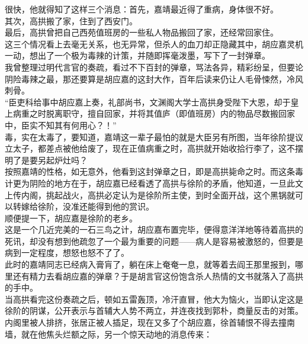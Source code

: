 \begin{multicols}{\theparacolNo}
很快，他就得知了这样三个消息：首先，嘉靖最近得了重病，身体很不好。\\

其次，高拱搬了家，住到了西安门。\\

最后，高拱曾把自己西苑值班房的一些私人物品搬回了家，还经常回家住。\\

这三个情况看上去毫无关系，也无异常，但杀人的血刀却正隐藏其中，胡应嘉灵机一动，想出了一个极为毒辣的计策，并随即挥毫泼墨，写下了一封弹章。\\

我曾整理过明代言官的奏疏，看过不下百封的弹章，骂法各异，精彩纷呈，但要论阴险毒辣之最，那还要算是胡应嘉的这封大作，百年后读来仍让人毛骨悚然，冷风刺骨。\\

“臣吏科给事中胡应嘉上奏，礼部尚书，文渊阁大学士高拱身受陛下大恩，却于皇上病重之时脱离职守，擅自回家，并将其值庐（即值班房）内的物品尽数搬回家中，臣实不知其有何用心？！”\\

毒，实在太毒了，要知道，嘉靖这一辈子最怕的就是大臣另有所图，当年徐阶提议立太子，都差点被他给废了，现在正值病重之时，高拱就开始收拾行李了，这不摆明了是要另起炉灶吗？\\

按照嘉靖的性格，如无意外，他看到这封弹章之日，即是高拱毙命之时。而这条毒计更为阴险的地方在于，胡应嘉已经看透了高拱与徐阶的矛盾，他知道，一旦此文上传内阁，挑起战火，高拱必定认为是徐阶所主使，到时全面开战，这个黑锅就可以转嫁给徐阶，没准还能得到他的赏识。\\

顺便提一下，胡应嘉是徐阶的老乡。\\

这是一个几近完美的一石三鸟之计，胡应嘉布置完毕，便得意洋洋地等待着高拱的死讯，却没有想到他疏忽了一个最为重要的问题——病人是容易被激怒的，但要是病到一定程度，想怒也怒不了了。\\

此时的嘉靖同志已经病入膏肓了，躺在床上奄奄一息，就等着去阎王那里报到，哪里还有精力去看胡应嘉的弹章？于是胡言官这份饱含杀人热情的文书就落入了高拱的手中。\\

当高拱看完这份奏疏之后，顿如五雷轰顶，冷汗直冒，他大为恼火，当即认定这是徐阶的阴谋，公开表示与首辅大人势不两立，并连夜找到郭朴，商量反击的对策。\\

内阁里被人排挤，张居正被人插足，现在又多了个胡应嘉，徐首辅恨不得去撞南墙，就在他焦头烂额之际，另一个惊天动地的消息传来：\\


\end{multicols}
